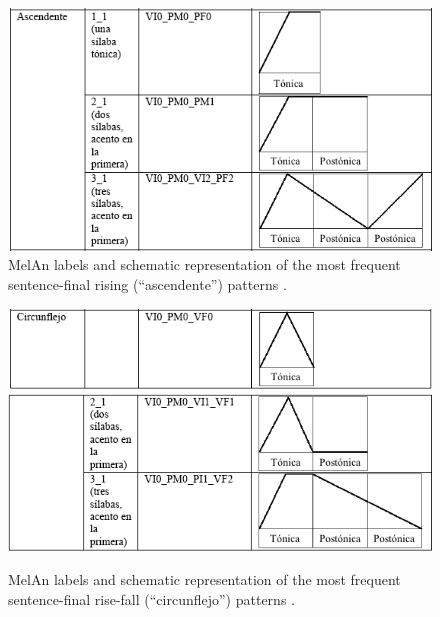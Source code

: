 \documentclass[output=paper]{langsci/langscibook}
\begin{document}
  
 

\begin{figure}
\includegraphics[width=.8\textwidth]{figures/GAR-img012-1.png}
\caption{MelAn labels and schematic representation of the most frequent sentence-final rising (``ascendente'') patterns \citep{Garrido2012enton}.}
\label{fig:gar:12}
\end{figure}\clearpage

  
   
 

\begin{figure}
\includegraphics[width=.8\textwidth]{figures/GAR-img013-1.png}   
\includegraphics[width=.8\textwidth]{figures/GAR-img014-2.png}
\caption{MelAn labels and schematic representation of the most frequent sentence-final rise-fall (``circunflejo'') patterns \citep{Garrido2012enton}.}
\label{fig:gar:13}
\end{figure}
\end{document}
